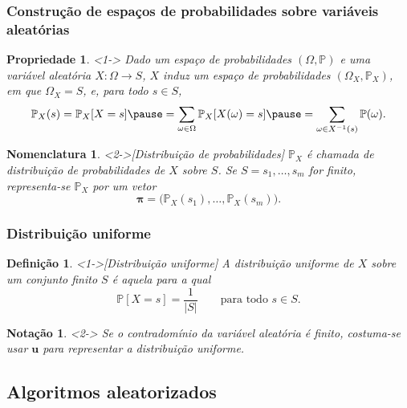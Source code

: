 \documentclass{beamer}
\def\Prob{\mathbb{P}} %
\def\MMp{\mathrm{.}} %
\def\cardi#1{\left| #1 \right|} %
\def\funcao#1#2#3{#1\colon #2\rightarrow #3} %
\def\vetor#1{\boldsymbol{#1}}
\theoremstyle{teoaxicorlem}
\newtheorem{Propr}{Propriedade}
\theoremstyle{defnotnom}
\newtheorem{Def}{Definição}
\newtheorem{Not}{Notação}
\newtheorem{Nom}{Nomenclatura}
\begin{document}
\begin{frame}
  \frametitle{Construção de espaços de probabilidades sobre variáveis
    aleatórias}
  \begin{Propr}<1->
    \footnotesize
    Dado um espaço de probabilidades $(\Omega,\Prob)$ e uma variável
    aleatória $\funcao{X}{\Omega}{S}$, $X$ induz um espaço de
    probabilidades $(\Omega_X, \Prob_X)$, em que $\Omega_X = S$, e,
    para todo $s\in S$,
    \begin{equation*}
      \Prob_X(s) = \Prob_X[X=s] \pause
      = \sum_{\omega\in\Omega}\Prob_X[X(\omega) = s]\pause
      = \sum_{\omega\in X^{-1}(s)}\Prob(\omega)\MMp
    \end{equation*}
  \end{Propr}
  \vfill\pause
  \begin{Nom}<2->[Distribuição de probabilidades]
    \footnotesize
    $\Prob_X$ é chamada de \alert{distribuição de probabilidades} de $X$
    sobre
    $S$. Se $S={s_1,\dotsc,s_m}$
    for finito, representa-se $\Prob_X$ por um vetor
    \begin{equation*}
      \vetor{\pi} = {\bigl(\Prob_X(s_1),\dotsc,\Prob_X(s_m)\bigr)}\MMp
    \end{equation*}
  \end{Nom}
\end{frame}

\begin{frame}
  \frametitle{Distribuição uniforme}
  \begin{Def}<1->[Distribuição uniforme]
    A \alert{distribuição uniforme} de $X$ sobre um conjunto finito
    $S$ é aquela para a qual
    \begin{equation*}
      \Prob[X=s] = \frac1{\cardi{S}}\qquad\text{para todo $s\in S$.}
    \end{equation*}
  \end{Def}
  \vfill
  \begin{Not}<2->
    Se o contradomínio da variável aleatória é finito,
    costuma-se usar $\vetor{u}$ para representar a distribuição
    uniforme.
  \end{Not}
\end{frame}

\subsection{Algoritmos aleatorizados}
\end{document}
